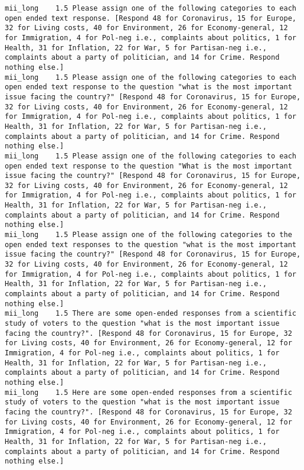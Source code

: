 \begin{lstlisting}[label=lst:promptvariants]
mii_long	1.5	Please assign one of the following categories to each open ended text response. [Respond 48 for Coronavirus, 15 for Europe, 32 for Living costs, 40 for Environment, 26 for Economy-general, 12 for Immigration, 4 for Pol-neg i.e., complaints about politics, 1 for Health, 31 for Inflation, 22 for War, 5 for Partisan-neg i.e., complaints about a party of politician, and 14 for Crime. Respond nothing else.]
mii_long	1.5	Please assign one of the following categories to each open ended text response to the question "what is the most important issue facing the country?" [Respond 48 for Coronavirus, 15 for Europe, 32 for Living costs, 40 for Environment, 26 for Economy-general, 12 for Immigration, 4 for Pol-neg i.e., complaints about politics, 1 for Health, 31 for Inflation, 22 for War, 5 for Partisan-neg i.e., complaints about a party of politician, and 14 for Crime. Respond nothing else.]
mii_long	1.5	Please assign one of the following categories to each open ended text response to the question "What is the most important issue facing the country?" [Respond 48 for Coronavirus, 15 for Europe, 32 for Living costs, 40 for Environment, 26 for Economy-general, 12 for Immigration, 4 for Pol-neg i.e., complaints about politics, 1 for Health, 31 for Inflation, 22 for War, 5 for Partisan-neg i.e., complaints about a party of politician, and 14 for Crime. Respond nothing else.]
mii_long	1.5	Please assign one of the following categories to the open ended text responses to the question "what is the most important issue facing the country?" [Respond 48 for Coronavirus, 15 for Europe, 32 for Living costs, 40 for Environment, 26 for Economy-general, 12 for Immigration, 4 for Pol-neg i.e., complaints about politics, 1 for Health, 31 for Inflation, 22 for War, 5 for Partisan-neg i.e., complaints about a party of politician, and 14 for Crime. Respond nothing else.]
mii_long	1.5	There are some open-ended responses from a scientific study of voters to the question "what is the most important issue facing the country?". [Respond 48 for Coronavirus, 15 for Europe, 32 for Living costs, 40 for Environment, 26 for Economy-general, 12 for Immigration, 4 for Pol-neg i.e., complaints about politics, 1 for Health, 31 for Inflation, 22 for War, 5 for Partisan-neg i.e., complaints about a party of politician, and 14 for Crime. Respond nothing else.]
mii_long	1.5	Here are some open-ended responses from a scientific study of voters to the question "what is the most important issue facing the country?". [Respond 48 for Coronavirus, 15 for Europe, 32 for Living costs, 40 for Environment, 26 for Economy-general, 12 for Immigration, 4 for Pol-neg i.e., complaints about politics, 1 for Health, 31 for Inflation, 22 for War, 5 for Partisan-neg i.e., complaints about a party of politician, and 14 for Crime. Respond nothing else.]

\end{lstlisting}
